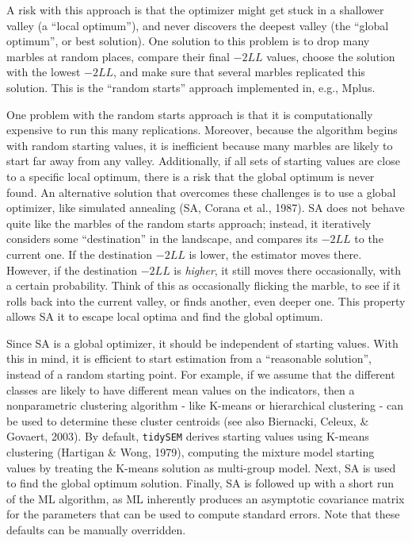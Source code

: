 \documentclass[
  ,man,floatsintext]{apa6}
\begin{document}
A risk with this approach is that the optimizer might get stuck in a shallower valley (a ``local optimum''),
and never discovers the deepest valley (the ``global optimum'', or best solution).
One solution to this problem is to drop many marbles at random places,
compare their final \(-2LL\) values,
choose the solution
with the lowest \(-2LL\), and make sure that several marbles replicated
this solution.
This is the ``random starts'' approach implemented in, e.g., Mplus.

One problem with the random starts approach is that it is
computationally expensive to run this many replications. Moreover,
because the algorithm begins with random starting values,
it is inefficient because many marbles are likely to start far away from any valley.
Additionally, if all sets of starting values are close to a specific local optimum,
there is a risk that the global optimum is never found.
An alternative solution that overcomes these challenges is to use a global optimizer, like simulated annealing (SA, Corana et al., 1987).
SA does not behave quite like the marbles of the random starts approach;
instead, it iteratively considers some ``destination'' in the landscape,
and compares its \(-2LL\) to the current one.
If the destination \(-2LL\) is lower,
the estimator moves there.
However, if the destination \(-2LL\) is \emph{higher},
it still moves there occasionally, with a certain probability.
Think of this as occasionally flicking the marble,
to see if it rolls back into the current valley, or finds another,
even deeper one.
This property allows SA it to escape local optima and find the global optimum.

Since SA is a global optimizer, it should be independent of starting values.
With this in mind, it is efficient to start estimation from a ``reasonable solution'', instead of a random starting point.
For example, if we assume that the different classes are likely to have different mean values on the indicators,
then a nonparametric clustering algorithm - like K-means or hierarchical clustering - can be used to determine these cluster centroids (see also Biernacki, Celeux, \& Govaert, 2003).
By default, \texttt{tidySEM} derives starting values using K-means clustering (Hartigan \& Wong, 1979),
computing the mixture model starting values by treating the K-means solution as multi-group model.
Next, SA is used to find the global optimum solution.
Finally, SA is followed up with a short run of the ML algorithm,
as ML inherently produces an asymptotic
covariance matrix for the parameters that can be used to compute
standard errors.
Note that these defaults can be manually overridden.
\end{document}
